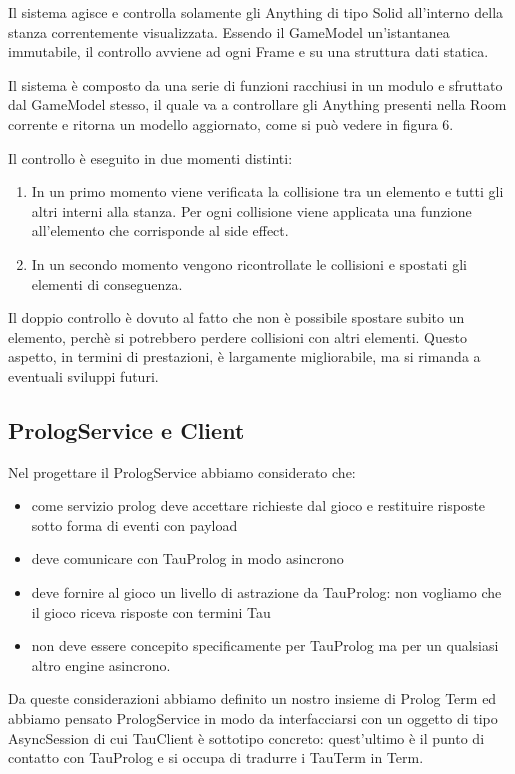 Il sistema agisce e controlla solamente gli Anything di tipo Solid all'interno della stanza correntemente visualizzata.
Essendo il GameModel un'istantanea immutabile, il controllo avviene ad ogni Frame e su una struttura dati statica. 

Il sistema è composto da una serie di funzioni racchiusi in un modulo e sfruttato dal GameModel stesso, il quale va a controllare gli Anything presenti nella Room corrente e ritorna un modello aggiornato, come si può vedere in figura 6.

Il controllo è eseguito in due momenti distinti: 
\begin{enumerate}
  \item In un primo momento viene verificata la collisione tra un elemento e tutti gli altri interni alla stanza. Per ogni collisione viene applicata una funzione all'elemento che corrisponde al side effect.
  \item In un secondo momento vengono ricontrollate le collisioni e spostati gli elementi di conseguenza. 
\end{enumerate}

Il doppio controllo è dovuto al fatto che non è possibile spostare subito un elemento, perchè si potrebbero perdere collisioni con altri elementi.
Questo aspetto, in termini di prestazioni, è largamente migliorabile, ma si rimanda a eventuali sviluppi futuri.

\subsection{PrologService e Client}
Nel progettare il PrologService abbiamo considerato che:
\begin{itemize}
    \item come servizio prolog deve accettare richieste dal gioco e restituire risposte sotto forma di eventi con payload
    \item deve comunicare con TauProlog in modo asincrono
    \item deve fornire al gioco un livello di astrazione da TauProlog: non vogliamo che il gioco riceva risposte con termini Tau
    \item non deve essere concepito specificamente per TauProlog ma per un qualsiasi altro engine asincrono.
\end{itemize}   

Da queste considerazioni abbiamo definito un nostro insieme di Prolog Term ed abbiamo pensato PrologService in modo da interfacciarsi con un oggetto di tipo AsyncSession di cui TauClient è sottotipo concreto: quest'ultimo è il punto di contatto con TauProlog e si occupa di tradurre i TauTerm in Term.

